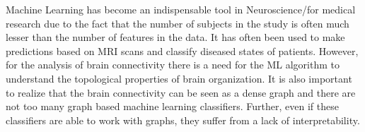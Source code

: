 \documentclass[msthesis.tex]{subfiles}
\begin{document}
Machine Learning has become an indispensable tool in Neuroscience/for medical research due to the fact that the number of subjects in the study is often much lesser than the number of features in the data. It has often been used to make predictions based on MRI scans and classify diseased states of patients. However, for the analysis of brain connectivity there is a need for the ML algorithm to understand the topological properties of brain organization. It is also important to realize that the brain connectivity can be seen as a dense graph and there are not too many graph based machine learning classifiers. Further, even if these classifiers are able to work with graphs, they suffer from a lack of interpretability. 

\iffalse

through neurotransmitters and ... action potentials. (explain how different parts of the brain are connected and what types of chemical reactions lead to behavior, intelligence, disease etc.) In terms of physics, we can consider the brain to be a dynamic system in which an ensemble of cells communicate with each other for (maintaining proper function)? Number of connections in the brain, number of neurons
The brains ability to learn arises from modification, strengthening and pruning of large number of connections between its neurons. When a child grows there are x number of neurons, as we \cite{10.3389/fnins.2018.00525}
\fi

\cite{10.3389/fnagi.2017.00329}
\end{document}
